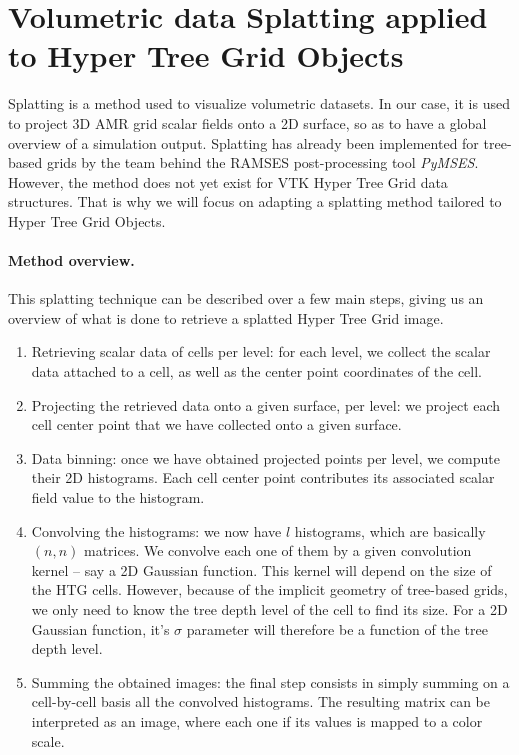 \documentclass[
	a4paper,
	12pt,
	raggedright,
	twoside
]{tufte-style-article}
\theoremstyle{definition}
\theoremstyle{remark}
\begin{document}
\section{Volumetric data Splatting applied to Hyper Tree Grid Objects}
Splatting is a method used to visualize volumetric datasets. In our case, it is used to project 3D \Gls{AMR} grid scalar fields onto a 2D surface, so as to have a global overview of a simulation output. Splatting has already been implemented for tree-based grids by the team behind the RAMSES post-processing tool \textit{PyMSES}.\cite{pymses_website} However, the method does not yet exist for \Gls{VTK} Hyper Tree Grid data structures. That is why we will focus on adapting a splatting method tailored to Hyper Tree Grid Objects.

\paragraph{Method overview.} This splatting technique can be described over a few main steps, giving us an overview of what is done to retrieve a splatted Hyper Tree Grid image.
\begin{enumerate}
    \item Retrieving scalar data of cells per level: for each level, we collect the scalar data attached to a cell, as well as the center point coordinates of the cell.
    \item Projecting the retrieved data onto a given surface, per level: we project each cell center point that we have collected onto a given surface.
    \item Data binning: once we have obtained projected points per level, we compute their 2D histograms. Each cell center point contributes its associated scalar field value to the histogram.
    \item Convolving the histograms: we now have $l$ histograms, which are basically $(n, n)$ matrices. We convolve each one of them by a given convolution kernel -- say a 2D Gaussian function. This kernel will depend on the size of the \Gls{HTG} cells. However, because of the implicit geometry of tree-based grids, we only need to know the tree depth level of the cell to find its size. For a 2D Gaussian function, it's $\sigma$ parameter will therefore be a function of the tree depth level.
    \item Summing the obtained images: the final step consists in simply summing on a cell-by-cell basis all the convolved histograms. The resulting matrix can be interpreted as an image, where each one if its values is mapped to a color scale.
\end{enumerate}
\end{document}
